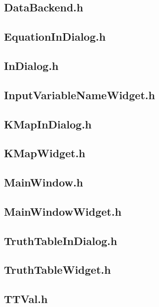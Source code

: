 \subsection{DataBackend.h}

\subsection{EquationInDialog.h}

\subsection{InDialog.h}

\subsection{InputVariableNameWidget.h}

\subsection{KMapInDialog.h}

\subsection{KMapWidget.h}

\subsection{MainWindow.h}

\subsection{MainWindowWidget.h}

\subsection{TruthTableInDialog.h}

\subsection{TruthTableWidget.h}

\subsection{TTVal.h}


